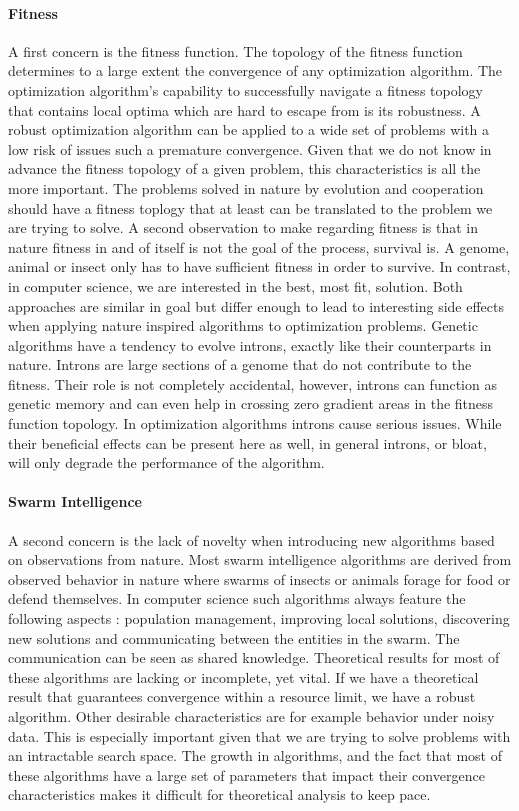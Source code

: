 \paragraph{Fitness}
A first concern is the fitness function. The topology of the fitness function determines to a large extent the convergence of any optimization algorithm. The optimization algorithm's capability to successfully navigate a fitness topology that contains local optima which are hard to escape from is its robustness. A robust optimization algorithm can be applied to a wide set of problems with a low risk of issues such a premature convergence. Given that we do not know in advance the fitness topology of a given problem, this characteristics is all the more important.
The problems solved in nature by evolution and cooperation should have a fitness toplogy that at least can be translated to the problem we are trying to solve. A second observation to make regarding fitness is that in nature fitness in and of itself is not the goal of the process, survival is. A genome, animal or insect only has to have sufficient fitness in order to survive. In contrast, in computer science, we are interested in the best, most fit, solution. Both approaches are similar in goal but differ enough to lead to interesting side effects when applying nature inspired algorithms to optimization problems. Genetic algorithms have a tendency to evolve introns, exactly like their counterparts in nature. Introns are large sections of a genome that do not contribute to the fitness. Their role is not completely accidental, however, introns can function as genetic memory and can even help in crossing zero gradient areas in the fitness function topology. 
In optimization algorithms introns cause serious issues. While their beneficial effects can be present here as well, in general introns, or bloat, will only degrade the performance of the algorithm. 
\paragraph{Swarm Intelligence}
A second concern is the lack of novelty when introducing new algorithms based on observations from nature. Most swarm intelligence algorithms are derived from observed behavior in nature where swarms of insects or animals forage for food or defend themselves. 
In computer science such algorithms always feature the following aspects : population management, improving local solutions, discovering new solutions and communicating between the entities in the swarm. The communication can be seen as shared knowledge.
Theoretical results for most of these algorithms are lacking or incomplete, yet vital. If we have a theoretical result that guarantees convergence within a resource limit, we have a robust algorithm. Other desirable characteristics are for example behavior under noisy data\citep{ACONoise}. 
This is especially important given that we are trying to solve problems with an intractable search space. The growth in algorithms, and the fact that most of these algorithms have a large set of parameters that impact their convergence characteristics makes it difficult for theoretical analysis to keep pace.


